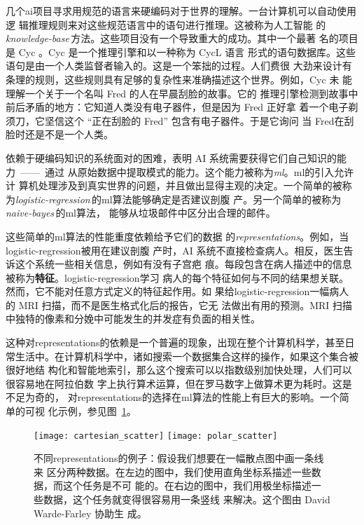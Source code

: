 几个\gls*{ai}项目寻求用规范的语言来硬编码对于世界的理解。一台计算机可以自动使用逻
辑推理规则来对这些规范语言中的语句进行推理。这被称为人工智能
的\emph{\gls{knowledge-base}}\,方法。这些项目没有一个导致重大的成功。其中一个最著
名的项目是 Cyc \citep{Lenat-1989-book}。Cyc 是一个推理引擎和以一种称为 CycL 语言
形式的语句数据库。这些语句是由一个人类监督者输入的。这是一个笨拙的过程。人们费很
大劲来设计有条理的规则，这些规则具有足够的复杂性来准确描述这个世界。例如，Cyc 未
能理解一个关于一个名叫 Fred 的人在早晨刮脸的故事\citep{MachineChangedWorld}。它的
推理引擎检测到故事中前后矛盾的地方：它知道人类没有电子器件，但是因为 Fred 正好拿
着一个电子剃须刀，它坚信这个 ``正在刮脸的 Fred'' 包含有电子器件。于是它询问
当 Fred在刮脸时还是不是一个人类。

依赖于硬编码知识的系统面对的困难，表明 AI 系统需要获得它们自己知识的能力~——~通过
从原始数据中提取模式的能力。这个能力被称为\emph{\gls{ml}}。\gls*{ml}的引入允许计
算机处理涉及到真实世界的问题，并且做出显得主观的决定。一个简单的被称
为\emph{\gls{logistic-regression}}\,的\gls*{ml}算法能够确定是否建议剖腹
产\citep{MorYosef90}。另一个简单的被称为\emph{\gls{naive-bayes}}\,的\gls*{ml}算法，
能够从垃圾邮件中区分出合理的邮件。

这些简单的\gls*{ml}算法的性能重度依赖给予它们的数据
的\emph{\gls{representations}}。例如，当\gls*{logistic-regression}被用在建议剖腹
产时，AI 系统不直接检查病人。相反，医生告诉这个系统一些相关信息，例如有没有子宫疤
痕。每段包含在病人描述中的信息被称为\textbf{特征}。\gls*{logistic-regression}学习
病人的每个特征如何与不同的结果想关联。然而，它不能对任意方式定义的特征起作用。如
果给\gls*{logistic-regression}一幅病人的 MRI 扫描，而不是医生格式化后的报告，它无
法做出有用的预测。MRI 扫描中独特的像素和分娩中可能发生的并发症有负面的相关性。

这种对\gls*{representations}的依赖是一个普遍的现象，出现在整个计算机科学，甚至日
常生活中。在计算机科学中，诸如搜索一个数据集合这样的操作，如果这个集合被很好地结
构化和智能地索引，那么这个搜索可以以指数级别加快处理，人们可以很容易地在阿拉伯数
字上执行算术运算，但在罗马数字上做算术更为耗时。这是不足为奇的，
对\gls*{representations}的选择在\gls*{ml}算法的性能上有巨大的影响。一个简单的可视
化示例，参见图~\ref{fig:different_representations}。

\begin{figure}[h]
  \centering
  \texttt{[image: cartesian\_scatter]}
  \texttt{[image: polar\_scatter]}
  \caption{不同\gls*{representations}的例子：假设我们想要在一幅散点图中画一条线来
    区分两种数据。在左边的图中，我们使用直角坐标系描述一些数据，而这个任务是不可
    能的。在右边的图中，我们用极坐标描述一些数据，这个任务就变得很容易用一条竖线
    来解决。这个图由 David Warde-Farley 协助生
    成。\label{fig:different_representations}}
\end{figure}

